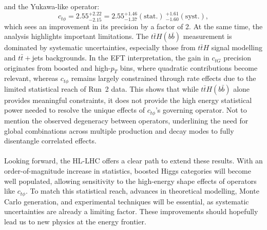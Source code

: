 and the Yukawa-like operator:
\begin{equation*}
    c_{t\phi} = 2.55^{+2.22}_{-2.15}=2.55^{+1.46}_{-1.37} (\text{stat.})~^{+1.61}_{-1.60} (\text{syst.}), 
\end{equation*}
which sees an improvement in its precision by a factor of 2.
At the same time, the analysis highlights important limitations. The $t\bar{t}H(b\bar{b})$ measurement is dominated by systematic uncertainties, especially those from $t\bar{t}H$ signal modelling and $t\bar{t}+$jets backgrounds. In the EFT interpretation, the gain in $c_{tG}$ precision originates from boosted and high-$p_T$ bins, where quadratic contributions become relevant, whereas $c_{t\phi}$ remains largely constrained through rate effects due to the limited statistical reach of Run~2 data. This shows that while $t\bar{t}H(b\bar{b})$ alone provides meaningful constraints, it does not provide the high energy statistical power needed to resolve the unique effects of $c_{t\phi}$'s governing operator. Not to mention the observed degeneracy between operators, underlining the need for global combinations across multiple production and decay modes to fully disentangle correlated effects.\\
\\
Looking forward, the HL-LHC offers a clear path to extend these results. With an order-of-magnitude increase in statistics, boosted Higgs categories will become well populated, allowing sensitivity to the high-energy shape effects of operators like $c_{t\phi}$. To match this statistical reach, advances in theoretical modelling, Monte Carlo generation, and experimental techniques will be essential, as systematic uncertainties are already a limiting factor. These improvements should hopefully lead us to new physics at the energy frontier.
